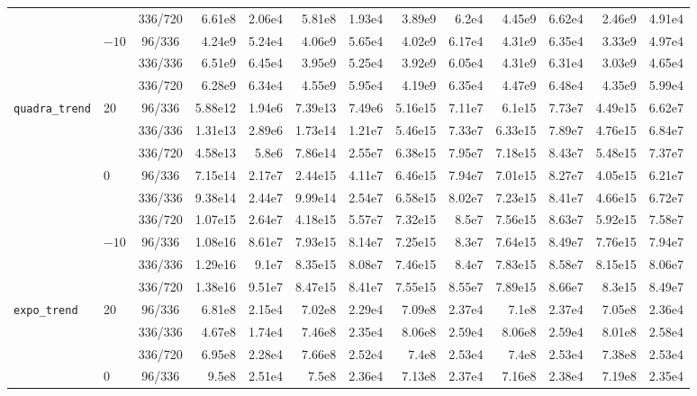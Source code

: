 \documentclass[12pt]{article}
\theoremstyle{definition}
\begin{document}
{\begin{enumerate}[label=\textbf{1.2.\arabic*}, leftmargin=*]
{\begin{longtable}{@{}llc@{\hspace{6pt}}rr@{\hspace{8pt}}rr@{\hspace{8pt}}rr@{\hspace{8pt}}rr@{\hspace{8pt}}rr@{}}
 &  & 336/720 & 6.61e8 & 2.06e4 & 5.81e8 & 1.93e4 & 3.89e9 & 6.2e4 & 4.45e9 & 6.62e4 & 2.46e9 & 4.91e4 \\
\addlinespace[2pt]
 & $-10$ & 96/336 & 4.24e9 & 5.24e4 & 4.06e9 & 5.65e4 & 4.02e9 & 6.17e4 & 4.31e9 & 6.35e4 & 3.33e9 & 4.97e4 \\
 &  & 336/336 & 6.51e9 & 6.45e4 & 3.95e9 & 5.25e4 & 3.92e9 & 6.05e4 & 4.31e9 & 6.31e4 & 3.03e9 & 4.65e4 \\
 &  & 336/720 & 6.28e9 & 6.34e4 & 4.55e9 & 5.95e4 & 4.19e9 & 6.35e4 & 4.47e9 & 6.48e4 & 4.35e9 & 5.99e4 \\
\midrule
\texttt{quadra\_trend} & 20 & 96/336 & 5.88e12 & 1.94e6 & 7.39e13 & 7.49e6 & 5.16e15 & 7.11e7 & 6.1e15 & 7.73e7 & 4.49e15 & 6.62e7 \\
 &  & 336/336 & 1.31e13 & 2.89e6 & 1.73e14 & 1.21e7 & 5.46e15 & 7.33e7 & 6.33e15 & 7.89e7 & 4.76e15 & 6.84e7 \\
 &  & 336/720 & 4.58e13 & 5.8e6 & 7.86e14 & 2.55e7 & 6.38e15 & 7.95e7 & 7.18e15 & 8.43e7 & 5.48e15 & 7.37e7 \\
\addlinespace[2pt]
 & 0 & 96/336 & 7.15e14 & 2.17e7 & 2.44e15 & 4.11e7 & 6.46e15 & 7.94e7 & 7.01e15 & 8.27e7 & 4.05e15 & 6.21e7 \\
 &  & 336/336 & 9.38e14 & 2.44e7 & 9.99e14 & 2.54e7 & 6.58e15 & 8.02e7 & 7.23e15 & 8.41e7 & 4.66e15 & 6.72e7 \\
 &  & 336/720 & 1.07e15 & 2.64e7 & 4.18e15 & 5.57e7 & 7.32e15 & 8.5e7 & 7.56e15 & 8.63e7 & 5.92e15 & 7.58e7 \\
\addlinespace[2pt]
 & $-10$ & 96/336 & 1.08e16 & 8.61e7 & 7.93e15 & 8.14e7 & 7.25e15 & 8.3e7 & 7.64e15 & 8.49e7 & 7.76e15 & 7.94e7 \\
 &  & 336/336 & 1.29e16 & 9.1e7 & 8.35e15 & 8.08e7 & 7.46e15 & 8.4e7 & 7.83e15 & 8.58e7 & 8.15e15 & 8.06e7 \\
 &  & 336/720 & 1.38e16 & 9.51e7 & 8.47e15 & 8.41e7 & 7.55e15 & 8.55e7 & 7.89e15 & 8.66e7 & 8.3e15 & 8.49e7 \\
\midrule
\texttt{expo\_trend} & 20 & 96/336 & 6.81e8 & 2.15e4 & 7.02e8 & 2.29e4 & 7.09e8 & 2.37e4 & 7.1e8 & 2.37e4 & 7.05e8 & 2.36e4 \\
 &  & 336/336 & 4.67e8 & 1.74e4 & 7.46e8 & 2.35e4 & 8.06e8 & 2.59e4 & 8.06e8 & 2.59e4 & 8.01e8 & 2.58e4 \\
 &  & 336/720 & 6.95e8 & 2.28e4 & 7.66e8 & 2.52e4 & 7.4e8 & 2.53e4 & 7.4e8 & 2.53e4 & 7.38e8 & 2.53e4 \\
\addlinespace[2pt]
 & 0 & 96/336 & 9.5e8 & 2.51e4 & 7.5e8 & 2.36e4 & 7.13e8 & 2.37e4 & 7.16e8 & 2.38e4 & 7.19e8 & 2.35e4 \\

\end{longtable}}
\end{enumerate}}
\end{document}
